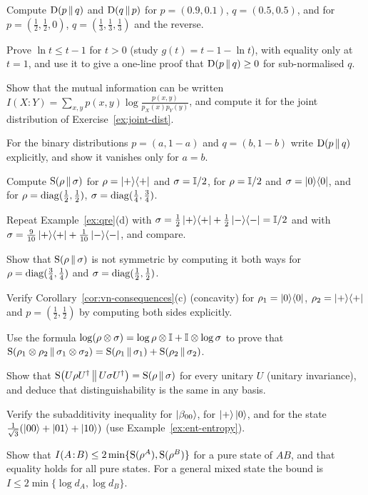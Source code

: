 \begin{exerciseset}
   Compute $\mathrm{D}\!\left(p\,\middle\|\,q\right)$ and $\mathrm{D}\!\left(q\,\middle\|\,p\right)$ for $p=(0.9,0.1)$, $q=(0.5,0.5)$, and for $p=(\tfrac12,\tfrac12,0)$, $q=(\tfrac13,\tfrac13,\tfrac13)$ and the reverse.

   Prove $\ln t\le t-1$ for $t>0$ (study $g(t)=t-1-\ln t$), with equality only at $t=1$, and use it to give a one-line proof that $\mathrm{D}\!\left(p\,\middle\|\,q\right)\ge0$ for sub-normalised $q$.

   Show that the mutual information can be written $I(X\!:\!Y)=\sum_{x,y}p(x,y)\log\frac{p(x,y)}{p_X(x)p_Y(y)}$, and compute it for the joint distribution of Exercise~\ref{ex:joint-dist}.

   For the binary distributions $p=(a,1-a)$ and $q=(b,1-b)$ write $\mathrm{D}\!\left(p\,\middle\|\,q\right)$ explicitly, and show it vanishes only for $a=b$.

   Compute $\mathrm{S}\!\left(\rho\,\middle\|\,\sigma\right)$ for $\rho=\left|+\right\rangle\!\left\langle+\right|$ and $\sigma=\mathbb{I}/2$, for $\rho=\mathbb{I}/2$ and $\sigma=\left|0\right\rangle\!\left\langle0\right|$, and for $\rho=\operatorname{diag}(\tfrac12,\tfrac12)$, $\sigma=\operatorname{diag}(\tfrac14,\tfrac34)$.

   Repeat Example~\ref{ex:qre}(d) with $\sigma=\tfrac12\left|+\right\rangle\!\left\langle+\right|+\tfrac12\left|-\right\rangle\!\left\langle-\right|=\mathbb{I}/2$ and with $\sigma=\tfrac{9}{10}\left|+\right\rangle\!\left\langle+\right|+\tfrac1{10}\left|-\right\rangle\!\left\langle-\right|$, and compare.

   Show that $\mathrm{S}\!\left(\rho\,\middle\|\,\sigma\right)$ is not symmetric by computing it both ways for $\rho=\operatorname{diag}(\tfrac34,\tfrac14)$ and $\sigma=\operatorname{diag}(\tfrac12,\tfrac12)$.

   Verify Corollary~\ref{cor:vn-consequences}(c) (concavity) for $\rho_1=\left|0\right\rangle\!\left\langle0\right|$, $\rho_2=\left|+\right\rangle\!\left\langle+\right|$ and $p=(\tfrac12,\tfrac12)$ by computing both sides explicitly.

   Use the formula $\log(\rho\otimes\sigma)=\log\rho\otimes\mathbb{I}+\mathbb{I}\otimes\log\sigma$ to prove that $\mathrm{S}\!\left(\rho_1\otimes\rho_2\,\middle\|\,\sigma_1\otimes\sigma_2\right)=\mathrm{S}\!\left(\rho_1\,\middle\|\,\sigma_1\right)+\mathrm{S}\!\left(\rho_2\,\middle\|\,\sigma_2\right)$.

   Show that $\mathrm{S}\!\left(U\rho U^\dagger\,\middle\|\,U\sigma U^\dagger\right)=\mathrm{S}\!\left(\rho\,\middle\|\,\sigma\right)$ for every unitary $U$ (unitary invariance), and deduce that distinguishability is the same in any basis.

   Verify the subadditivity inequality for $\left|\beta_{00}\right\rangle$, for $\left|+\right\rangle\left|0\right\rangle$, and for the state $\tfrac1{\sqrt3}(\left|00\right\rangle+\left|01\right\rangle+\left|10\right\rangle)$ (use Example~\ref{ex:ent-entropy}).

   Show that $I(A\!:\!B)\le2\min\{\mathrm{S}(\rho^A),\mathrm{S}(\rho^B)\}$ for a pure state of $AB$, and that equality holds for all pure states. For a general mixed state the bound is $I\le2\min\{\log d_A,\log d_B\}$.


\end{exerciseset}
